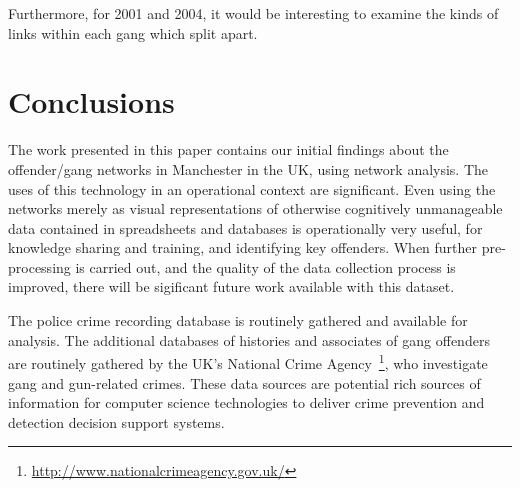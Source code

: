 \documentclass[conference]{IEEEtran}
\theoremstyle{definition}
\begin{document}
Furthermore, for 2001 and 2004, it would be interesting to examine the
kinds of links within each gang which split apart.


\section{Conclusions}\label{sec:conclusion}
The work presented in this paper contains our initial findings about
the offender/gang networks in Manchester in the UK, using network
analysis. The uses of this technology in an operational context are
significant. Even using the networks merely as visual representations
of otherwise cognitively unmanageable data contained in spreadsheets
and databases is operationally very useful, for knowledge sharing and
training, and identifying key offenders. When further pre-processing
is carried out, and the quality of the data collection process is
improved, there will be sigificant future work available with this
dataset.

The police crime recording database is routinely gathered and
available for analysis. The additional databases of histories and
associates of gang offenders are routinely gathered by the UK's
National Crime
Agency~\footnote{\url{http://www.nationalcrimeagency.gov.uk/}}, who
investigate gang and gun-related crimes. These data sources are
potential rich sources of information for computer science
technologies to deliver crime prevention and detection decision
support systems.





\end{document}

